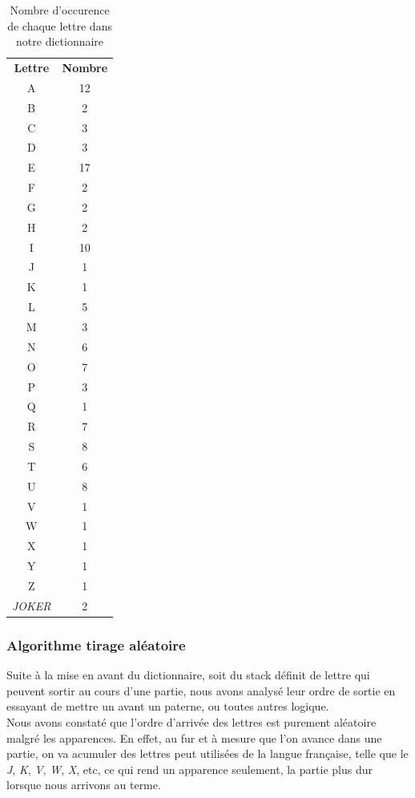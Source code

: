 \documentclass[a4paper,12pt]{article}
\begin{document}
		\begin{table}[h]
			\centering
			\begin{tabular}{cc}
				\textbf{Lettre} & \textbf{Nombre} \\
				A     & 12 \\
				B     & 2 \\
				C     & 3 \\
				D     & 3 \\
				E     & 17 \\
				F     & 2 \\
				G     & 2 \\
				H     & 2 \\
				I     & 10 \\
				J     & 1 \\
				K     & 1 \\
				L     & 5 \\
				M     & 3 \\
				N     & 6 \\
				O     & 7 \\
				P     & 3 \\
				Q     & 1 \\
				R     & 7 \\
				S     & 8 \\
				T     & 6 \\
				U     & 8 \\
				V     & 1 \\
				W     & 1 \\
				X     & 1 \\
				Y     & 1 \\
				Z     & 1 \\
				\textit{JOKER} & 2 
			\end{tabular}
			\caption{Nombre d'occurence de chaque lettre dans notre dictionnaire}
		\end{table}
		
		\subsubsection{Algorithme tirage aléatoire}
		Suite à la mise en avant du dictionnaire, soit du stack définit de lettre qui peuvent sortir au cours d'une partie, nous avons analysé leur ordre de sortie en essayant de mettre un avant un paterne, ou toutes autres logique. \\
		Nous avons constaté que l'ordre d'arrivée des lettres est purement aléatoire malgré les apparences. En effet, au fur et à mesure que l'on avance dans une partie, on va acumuler des lettres peut utilisées de la langue française, telle que le \textit{J}, \textit{K}, \textit{V}, \textit{W}, \textit{X}, etc, ce qui rend un apparence seulement, la partie plus dur lorsque nous arrivons au terme.
		
\end{document}
